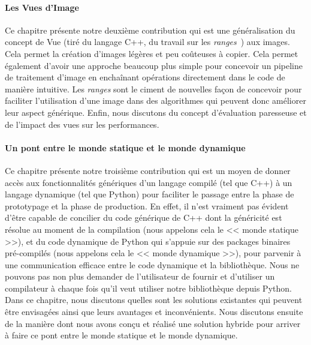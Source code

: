 \paragraph{Les Vues d'Image} Ce chapitre présente notre deuxième contribution qui est une généralisation du concept de
Vue (tiré du langage C++, du travail sur les \emph{ranges}~\parencite{niebler.2018.ranges}) aux images. Cela permet la
création d'images légères et peu coûteuses à copier. Cela permet également d'avoir une approche beaucoup plus simple
pour concevoir un pipeline de traitement d'image en enchaînant opérations directement dans le code de manière intuitive.
Les \emph{ranges} sont le ciment de nouvelles façon de concevoir pour faciliter l'utilisation d'une image dans des
algorithmes qui peuvent donc améliorer leur aspect générique. Enfin, nous discutons du concept d'évaluation paresseuse
et de l'impact des vues sur les performances.

\paragraph{Un pont entre le monde statique et le monde dynamique} Ce chapitre présente notre troisième contribution qui
est un moyen de donner accès aux fonctionnalités génériques d'un langage compilé (tel que C++) à un langage dynamique
(tel que Python) pour faciliter le passage entre la phase de prototypage et la phase de production. En effet, il n'est
vraiment pas évident d'être capable de concilier du code générique de C++ dont la généricité est résolue au moment de la
compilation (nous appelons cela le << monde statique >>), et du code dynamique de Python qui s'appuie sur des packages
binaires pré-compilés (nous appelons cela le << monde dynamique >>), pour parvenir à une communication efficace entre le
code dynamique et la bibliothèque. Nous ne pouvons pas non plus demander de l'utilisateur de fournir et d'utiliser un
compilateur à chaque fois qu'il veut utiliser notre bibliothèque depuis Python. Dans ce chapitre, nous discutons quelles
sont les solutions existantes qui peuvent être envisagées ainsi que leurs avantages et inconvénients. Nous discutons
ensuite de la manière dont nous avons conçu et réalisé une solution hybride pour arriver à faire ce pont entre le monde
statique et le monde dynamique.
